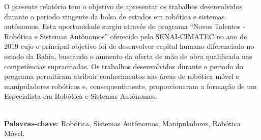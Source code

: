 \begin{thesisresumo}


  O presente relatório tem o objetivo de apresentar os trabalhos desenvolvidos durante o periodo vingente da bolsa de estudos em robótica e sistemas autônomos. Esta oportunidade surgiu através do programa ``Novos Talentos - Robótica e Sistemas Autônomos'' oferecido pelo SENAI-CIMATEC no ano de 2019 cujo o principal objetivo foi de desenvolver capital humano diferenciado no estado da Bahia, buscando o aumento da oferta de mão de obra qualificada nas competências supracitadas. Os trabalhos desenvolvidos durante o periodo do programa permitiram atribuir conhecimentos nas áreas de robótica móvel e manipuladores robóticos e, consequentimente, proporcionaram a formação de um Especialista em Robótica e Sistemas Autônomos. 


\ \\


\textbf{Palavras-chave}: Robótica, Sistemas Autônomos, Manipuladores, Robótica Móvel.

\end{thesisresumo}
